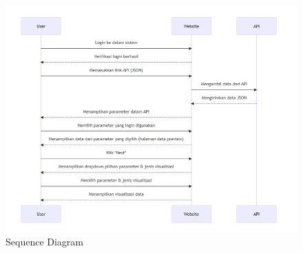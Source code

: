 \begin{figure}[H]
	\centering
	\includegraphics[width=0.8\linewidth]{gambar/Metodologi/Sequence Diagram.png}
	\caption{Sequence Diagram}
	\label{Sequence Diagram}
\end{figure}

